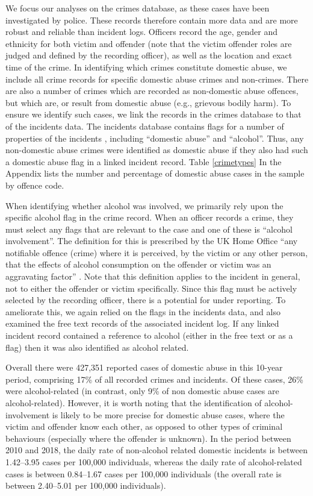 \documentclass[12pt, a4paper]{article}
\begin{document}
We focus our analyses on the crimes database, as these cases have been investigated by police. These records therefore contain more data and are more robust and reliable than incident logs. Officers record the age, gender and ethnicity for both victim and offender (note that the victim offender roles are judged and defined by the recording officer), as well as the location and exact time of the crime. 
In identifying which crimes constitute domestic abuse, we include all crime records for specific domestic abuse crimes and non-crimes. There are also a number of crimes which are recorded as non-domestic abuse offences, but which are, or result from domestic abuse (e.g., grievous bodily harm). To ensure we identify such cases, we link the records in the crimes database to that of the incidents data. The incidents database contains flags for a number of properties of the incidents , including ``domestic abuse'' and ``alcohol''. Thus, any non-domestic abuse crimes were identified as domestic abuse if they also had such a domestic abuse flag in a linked incident record. Table \ref{crimetypes} In the Appendix lists the number and percentage of domestic abuse cases in the sample by offence code.

When identifying whether alcohol was involved, we primarily rely upon the specific alcohol flag in the crime record. When an officer records a crime, they must select any flags that are relevant to the case and one of these is ``alcohol involvement''. The definition for this is prescribed by the UK Home Office ``any notifiable offence (crime) where it is perceived, by the victim or any other person, that the effects of alcohol consumption on the offender or victim was an aggravating factor'' \cite{Office2019}. Note that this definition applies to the incident in general, not to either the offender or victim specifically. Since this flag must be actively selected by the recording officer, there is a potential for under reporting. To ameliorate this, we again relied on the flags in the incidents data, and also examined the free text records of the associated incident log. If any linked incident record contained a reference to alcohol (either in the free text or as a flag) then it was also identified as alcohol related.


 Overall there were 427,351 reported cases of domestic abuse in this 10-year period, comprising 17\% of all recorded crimes and incidents. Of these cases, 26\% were alcohol-related (in contrast, only 9\% of non domestic abuse cases are alcohol-related). However, it is worth noting that the identification of alcohol-involvement is likely to be more precise for domestic abuse cases, where the victim and offender know each other, as opposed to other types of criminal behaviours (especially where the offender is unknown). In the period between 2010 and 2018, the daily rate of non-alcohol related domestic incidents is between 1.42--3.95 cases per 100,000 individuals, whereas the daily rate of alcohol-related cases is between 0.84--1.67 cases per 100,000 individuals (the overall rate is between 2.40--5.01 per 100,000 individuals). 
 
\end{document}
